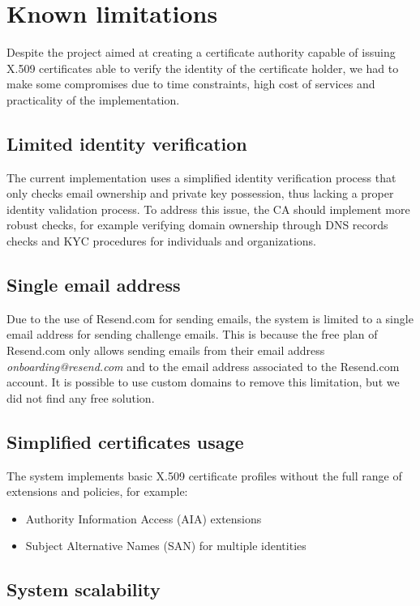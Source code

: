 \chapter{Known limitations}

Despite the project aimed at creating a certificate authority capable of issuing X.509 certificates 
able to verify the identity of the certificate holder, we had to make some compromises due to time
constraints, high cost of services and practicality of the implementation.

\section{Limited identity verification}
The current implementation uses a simplified identity verification process
that only checks email ownership and private key possession, thus lacking a proper identity validation
process. To address this issue, the CA should implement more robust checks, for example verifying
domain ownership through DNS records checks and KYC procedures for individuals and organizations.

\section{Single email address}
Due to the use of Resend.com for sending emails, the system is limited to a single email address
for sending challenge emails. This is because the free plan of Resend.com only allows sending emails
from their email address \textit{onboarding@resend.com} and to the email address associated to the Resend.com account.
It is possible to use custom domains to remove this limitation, but we did not find any free solution.

\section{Simplified certificates usage}

The system implements basic X.509 certificate profiles without the full range 
of extensions and policies, for example:
\begin{itemize}
    \item Authority Information Access (AIA) extensions
    \item Subject Alternative Names (SAN) for multiple identities
\end{itemize}

\section{System scalability}

